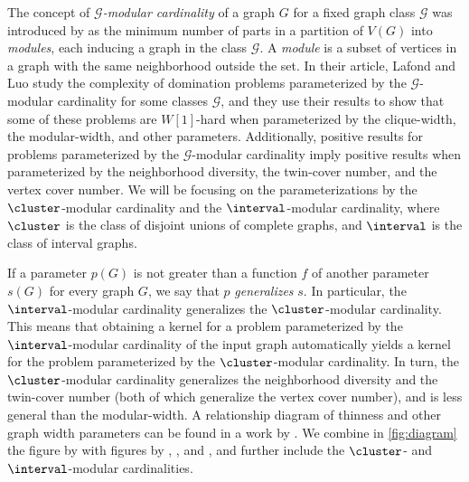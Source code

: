 \documentclass[11pt]{article}
\theoremstyle{plain}
\theoremstyle{definition}
\theoremstyle{remark}
\newcommand{\G}{\mathcal{G}}
\begin{document}
The concept of \emph{$\G$-modular cardinality} of a graph $G$ for a fixed graph class $\G$ was introduced by \citet{modular-partitions-MFCS23} as the minimum number of parts in a partition of $V(G)$ into \emph{modules}, each inducing a graph in the class $\G$. A \emph{module} is a subset of vertices in a graph with the same neighborhood outside the set. In their article, Lafond and Luo study the complexity of domination problems parameterized by the $\G$-modular cardinality for some classes $\G$, and they use their results to show that some of these problems are $W[1]$-hard when parameterized by the clique-width, the modular-width, and other parameters. Additionally, positive results for problems parameterized by the $\G$-modular cardinality imply positive results when parameterized by the neighborhood diversity, the twin-cover number, and the vertex cover number. We will be focusing on the parameterizations by the $\cluster$-modular cardinality and the $\interval$-modular cardinality, where $\cluster$ is the class of disjoint unions of complete graphs, and $\interval$ is the class of interval graphs. 

If a parameter $p(G)$ is not greater than a function $f$ of another parameter $s(G)$ for every graph $G$, we say that $p$ \emph{generalizes} $s$. In particular, the $\interval$-modular cardinality generalizes the $\cluster$-modular cardinality. This means that obtaining a kernel for a problem parameterized by the $\interval$-modular cardinality of the input graph automatically yields a kernel for the problem parameterized by the $\cluster$-modular cardinality. In turn, the $\cluster$-modular cardinality generalizes the neighborhood diversity and the twin-cover number (both of which generalize the vertex cover number), and is less general than the modular-width. A relationship diagram of thinness and other graph width parameters can be found in a work by \citet{B-B-M-P-convex-jcss}. We combine in \cref{fig:diagram} the figure by \citet{B-B-M-P-convex-jcss} with figures by \citet{Milanic-sim}, \citet{Belm-mw}, and \citet{modular-width}, and further include the $\cluster$- and $\interval$-modular cardinalities.
\end{document}
